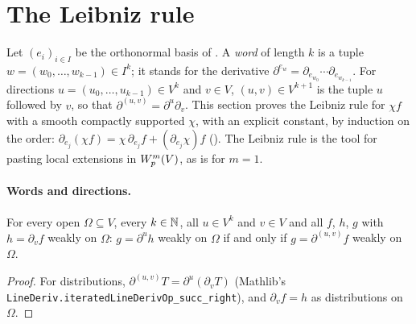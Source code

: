 \section{The Leibniz rule}
\label{sec:leibniz-rule}

Let $(e_i)_{i \in I}$ be the orthonormal basis of . A \emph{word} of
length $k$ is a tuple $w = (w_0, \dots, w_{k-1}) \in I^k$; it stands for the derivative
$\partial^{e_w} = \partial_{e_{w_0}} \cdots \partial_{e_{w_{k-1}}}$. For directions
$u = (u_0, \dots, u_{k-1}) \in V^k$ and $v \in V$, $(u, v) \in V^{k+1}$ is the tuple $u$ followed
by $v$, so that $\partial^{(u, v)} = \partial^u \partial_v$. This section proves the Leibniz rule
for $\chi f$ with a smooth compactly supported $\chi$, with an explicit constant, by induction on
the order: $\partial_{e_j} (\chi f) = \chi \, \partial_{e_j} f + (\partial_{e_j} \chi) f$
(). The Leibniz rule is the tool for pasting local
extensions in $W^{m}_{p}(V)$, as  is for $m = 1$.

\paragraph{Words and directions.}

\begin{lemma}
\label{lem:weak-derivative-snoc}
\leanok
{}
For every open $\Omega \subseteq V$, every $k \in \mathbb{N}$, all $u \in V^k$ and $v \in V$ and all
$f$, $h$, $g$ with $h = \partial_v f$ weakly on $\Omega$: $g = \partial^u h$ weakly on $\Omega$ if
and only if $g = \partial^{(u, v)} f$ weakly on $\Omega$.
\end{lemma}

\begin{proof}
\leanok
For distributions, $\partial^{(u, v)} T = \partial^u (\partial_v T)$ (Mathlib's
\texttt{LineDeriv.\allowbreak iteratedLineDerivOp\_\allowbreak succ\_\allowbreak right}), and
$\partial_v f = h$ as distributions on $\Omega$.
\end{proof}

